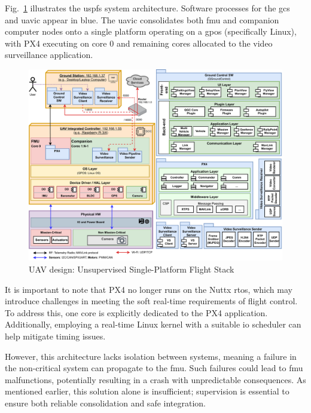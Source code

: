 Fig.~\ref{fig:uav-design-unsup} illustrates the \gls{uspfs} system architecture. Software processes for the \gls{gcs} and \gls{uavic} appear in blue. The \gls{uavic} consolidates both \gls{fmu} and companion computer nodes onto a single platform operating on a \gls{gpos} (specifically Linux), with PX4 executing on core 0 and remaining cores allocated to the video surveillance application.

\begin{figure}[!hbt]
  \centering
  \includegraphics[width=1.0\textwidth]{./img/pdf/uav-main-design-unsup.pdf} 
%   
  \caption{UAV design: Unsupervised Single-Platform Flight Stack}%
  \label{fig:uav-design-unsup}
\end{figure}

It is important to note that PX4 no longer runs on the Nuttx \gls{rtos}, which may introduce challenges in meeting the soft real-time requirements of flight control. To address this, one core is explicitly dedicated to the PX4 application. Additionally, employing a real-time Linux kernel with a suitable \gls{io} scheduler can help mitigate timing issues.

However, this architecture lacks isolation between systems, meaning a failure in the non-critical system can propagate to the \gls{fmu}. Such failures could lead to \gls{fmu} malfunctions, potentially resulting in a crash with unpredictable consequences. As mentioned earlier, this solution alone is insufficient; supervision is essential to ensure both reliable consolidation and safe integration.

